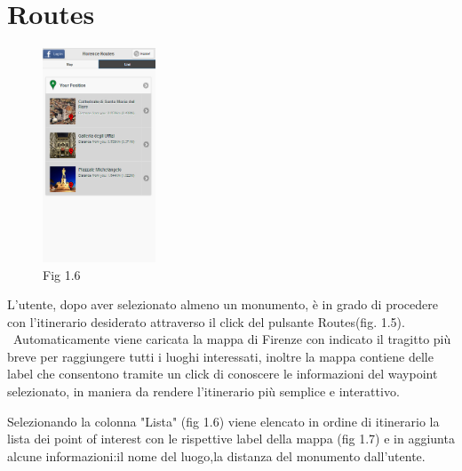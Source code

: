 \section{Routes}
\begin{figure}
  \vspace{-20pt}
  \begin{center}
   
\includegraphics[width=0.30\textwidth]{img/fig1-6}
  \end{center}
  \vspace{-20pt}
  \caption*{Fig 1.6}
  \vspace{-10pt}
\end{figure}
L'utente, dopo aver selezionato almeno un monumento, è in grado di procedere con l'itinerario desiderato attraverso il click del pulsante Routes(fig. 1.5).
\ Automaticamente viene caricata la mappa di Firenze con indicato il tragitto più breve per raggiungere tutti i luoghi interessati, inoltre la mappa contiene delle label che consentono tramite un click di conoscere le informazioni del waypoint selezionato, in maniera da rendere l'itinerario più semplice e interattivo.\ \



Selezionando la colonna "Lista" (fig 1.6) viene elencato in ordine di itinerario la lista dei point of interest con le rispettive label della mappa (fig 1.7) e in aggiunta alcune informazioni:il nome del luogo,la distanza del monumento dall'utente.\

